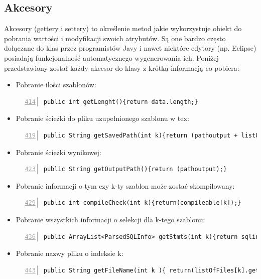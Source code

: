 \subsection{Akcesory}
Akcesory (gettery i settery) to określenie metod jakie wykorzystuje obiekt do pobrania wartości i modyfikacji swoich atrybutów. Są one bardzo często dołączane do klas przez programistów Javy i nawet niektóre edytory (np. Eclipse) posiadają funkcjonalność automatycznego wygenerowania ich. Poniżej przedstawiony został każdy akcesor do klasy z krótką informacją co pobiera:
\par
\begin{itemize}

\item Pobranie ilości szablonów:
 \begin{lstlisting}[numbers=left,firstnumber=414]
 public int getLenght(){return data.length;}
 \end{lstlisting}
 
\item Pobranie ścieżki do pliku uzupełnionego szablonu w tex:
 \begin{lstlisting}[numbers=left,firstnumber=419]
 public String getSavedPath(int k){return (pathoutput + listOfFiles[k].getName());}
     \end{lstlisting}
     
\item Pobranie ścieżki wynikowej:
 \begin{lstlisting}[numbers=left,firstnumber=423]
 public String getOutputPath(){return (pathoutput);}
     \end{lstlisting}
     
\item Pobranie informacji o tym czy k-ty szablon może zostać skompilowany:
 \begin{lstlisting}[numbers=left,firstnumber=429]
 public int compileCheck(int k){return(compileable[k]);}
     \end{lstlisting}
\item Pobranie wszystkich informacji o selekcji dla k-tego szablonu:
 \begin{lstlisting}[numbers=left,firstnumber=436]
 public ArrayList<ParsedSQLInfo> getStmts(int k){return sqlinfo.get(k);}
     \end{lstlisting}
\item Pobranie nazwy pliku o indeksie k: 
 \begin{lstlisting}[numbers=left,firstnumber=443]
 public String getFileName(int k ){ return(listOfFiles[k].getName());}
     \end{lstlisting}

\end{itemize}

